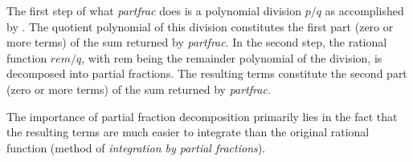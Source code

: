 \documentclass[../Maxima_Workbook.tex]{subfiles}
\begin{document}
\lz The first step of what \emph{partfrac} does is a polynomial division $ p/q $ as accomplished by . The quotient polynomial of this division constitutes the first part (zero or more terms) of the sum returned by \emph{partfrac}. In the second step, the rational function $ rem/q $, with rem being the remainder polynomial of the division, is decomposed into partial fractions. The resulting terms constitute the second part (zero or more terms) of the sum returned by \emph{partfrac}.

\lz The importance of partial fraction decomposition primarily lies in the fact that the resulting terms are much easier to integrate than the original rational function (method of \emph{integration by partial fractions}).
\end{document}
